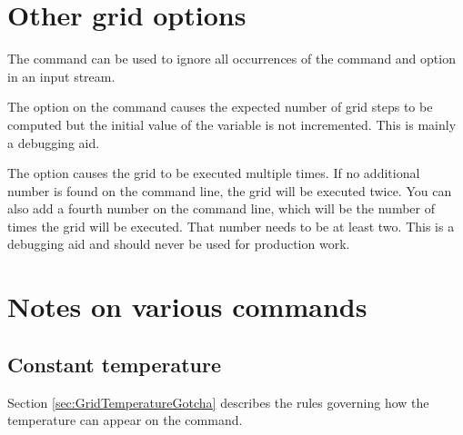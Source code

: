 \section{Other grid options}
\label{grid:other:options}

The  command can be used to ignore all
occurrences of the  command and 
option in an input stream.

The  option on the  command
causes the expected number of grid
steps to be computed but the initial value of the variable is not
incremented.
This is mainly a debugging aid. 

The  option causes the grid to be executed multiple times. If
no additional number is found on the command line, the grid will be executed
twice. You can also add a fourth number on the command line, which will be the
number of times the grid will be executed. That number needs to be at least
two. This is a debugging aid and should never be used for production work.

\section{Notes on various commands}

\subsection{Constant temperature}
Section \ref{sec:GridTemperatureGotcha}
describes the rules governing how the temperature can
appear on the  command.
